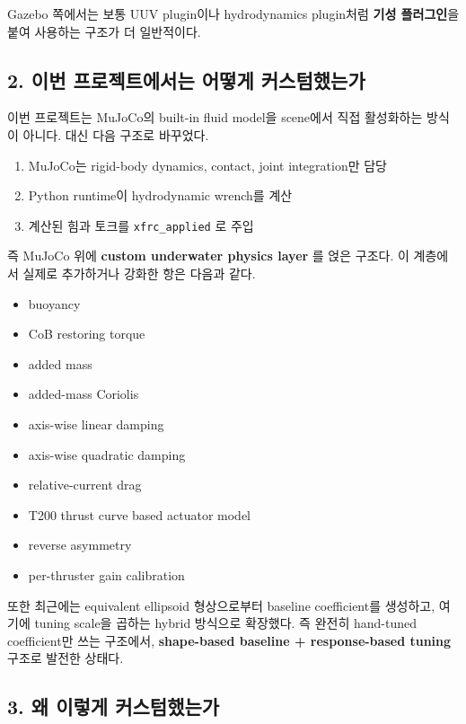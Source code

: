 \documentclass[11pt,a4paper]{article}
\begin{document}
Gazebo 쪽에서는 보통 UUV plugin이나 hydrodynamics plugin처럼 \textbf{기성 플러그인}을 붙여 사용하는 구조가 더 일반적이다.

\subsection{2. 이번 프로젝트에서는 어떻게 커스텀했는가}

이번 프로젝트는 MuJoCo의 built-in fluid model을 scene에서 직접 활성화하는 방식이 아니다. 대신 다음 구조로 바꾸었다.

\begin{enumerate}[leftmargin=2em]
  \item MuJoCo는 rigid-body dynamics, contact, joint integration만 담당
  \item Python runtime이 hydrodynamic wrench를 계산
  \item 계산된 힘과 토크를 \texttt{xfrc\_applied} 로 주입
\end{enumerate}

즉 MuJoCo 위에 \textbf{custom underwater physics layer} 를 얹은 구조다. 이 계층에서 실제로 추가하거나 강화한 항은 다음과 같다.

\begin{itemize}[leftmargin=2em]
  \item buoyancy
  \item CoB restoring torque
  \item added mass
  \item added-mass Coriolis
  \item axis-wise linear damping
  \item axis-wise quadratic damping
  \item relative-current drag
  \item T200 thrust curve based actuator model
  \item reverse asymmetry
  \item per-thruster gain calibration
\end{itemize}

또한 최근에는 equivalent ellipsoid 형상으로부터 baseline coefficient를 생성하고, 여기에 tuning scale을 곱하는 hybrid 방식으로 확장했다. 즉 완전히 hand-tuned coefficient만 쓰는 구조에서, \textbf{shape-based baseline + response-based tuning} 구조로 발전한 상태다.

\subsection{3. 왜 이렇게 커스텀했는가}
\end{document}
